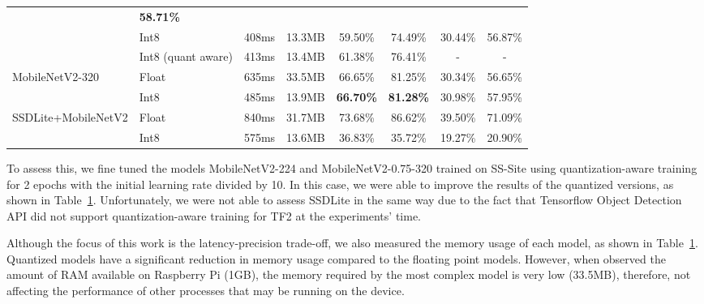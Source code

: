 \begin{table}[htb]
\begin{center}
{\begin{tabular}{ll|c|c|cc|cc}
 & \textbf{58.71\%}                 \\
                      & Int8        & 408ms   & 13.3MB       & 59.50\%


         & 74.49\%                           & 30.44\%

 & 56.87\%                          \\
                      & Int8 (quant aware)        & 413ms & 13.4MB
 & 61.38\% & 76.41\%  & - & -   \\ \hline
\multirow{2}{*}{MobileNetV2-320} & Float       & 635ms  & 33.5MB    & 66.65\%




         & 81.25\%                           & 30.34\%

 & 56.65\%                          \\
                      & Int8        & 485ms & 13.9MB  & \textbf{66.70\%}
         & \textbf{81.28\%}                  & 30.98\%

 & 57.95\%                          \\ \hline
\multirow{2}{*}{SSDLite+MobileNetV2} & Float       & 840ms & 31.7MB   & 73.68\%





         & 86.62\%                           & 39.50\%

 & 71.09\%                          \\
                      & Int8        & 575ms  &  13.6MB       & 36.83\%

         & 35.72\%                           & 19.27\%

 & 20.90\%                          \\ \hline
\end{tabular}}
\end{center}
\label{table:resolution}
\end{table}


To assess this, we fine tuned the models MobileNetV2-224 and
MobileNetV2-0.75-320 trained on SS-Site using quantization-aware training
for 2 epochs with the initial learning rate divided by 10. In this case, we were
able to improve the results of the quantized versions, as shown in
Table~\ref{table:resolution}. Unfortunately, we were not able to assess SSDLite
in the same way due to the fact that Tensorflow Object Detection API did not
support quantization-aware training for TF2 at the experiments' time.

Although the focus of this work is the latency-precision trade-off, we also
measured the memory usage of each model, as shown in
Table~\ref{table:resolution}. Quantized models have a significant reduction in
memory usage compared to the floating point models. However, when observed the
amount of RAM available on Raspberry Pi (1GB), the memory required by the
most complex model is very low (33.5MB), therefore, not affecting the
performance of other processes that may be running on the device.

